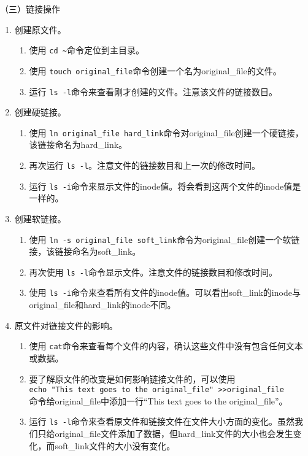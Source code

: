 \vspace{0.1in}
（三）链接操作
\begin{enumerate}
  \item 创建原文件。
    \begin{enumerate}
      \item 使用 \verb|cd ~|命令定位到主目录。
      \item 使用 \verb|touch original_file|命令创建一个名为original\_file的文件。
      \item 运行 \verb|ls -l|命令来查看刚才创建的文件。注意该文件的链接数目。
    \end{enumerate}
  \item 创建硬链接。
    \begin{enumerate}
      \item 使用 \verb|ln original_file hard_link|命令对original\_file创建一个硬链接，该链接命名为hard\_link。
      \item 再次运行 \verb|ls -l|。注意文件的链接数目和上一次的修改时间。
      \item 运行 \verb|ls -i|命令来显示文件的inode值。将会看到这两个文件的inode值是一样的。
    \end{enumerate}
  \item 创建软链接。
    \begin{enumerate}
      \item 使用 \verb|ln -s original_file soft_link|命令为original\_file创建一个软链接，该链接命名为soft\_link。
      \item 再次使用 \verb|ls -l|命令显示文件。注意文件的链接数目和修改时间。
      \item 使用 \verb|ls -i|命令来查看所有文件的inode值。可以看出soft\_link的inode与original\_file和hard\_link的inode不同。
    \end{enumerate}
  \item 原文件对链接文件的影响。
    \begin{enumerate}
      \item 使用 \verb|cat|命令来查看每个文件的内容，确认这些文件中没有包含任何文本或数据。
      \item 要了解原文件的改变是如何影响链接文件的，可以使用\\ \verb|echo "This text goes to the original_file" >>original_file| \\ 命令给original\_file中添加一行“This text goes to the original\_file”。
      \item 运行 \verb|ls -l|命令来查看原文件和链接文件在文件大小方面的变化。虽然我们只给original\_file文件添加了数据，但hard\_link文件的大小也会发生变化，而soft\_link文件的大小没有变化。

\end{enumerate}
\end{enumerate}
